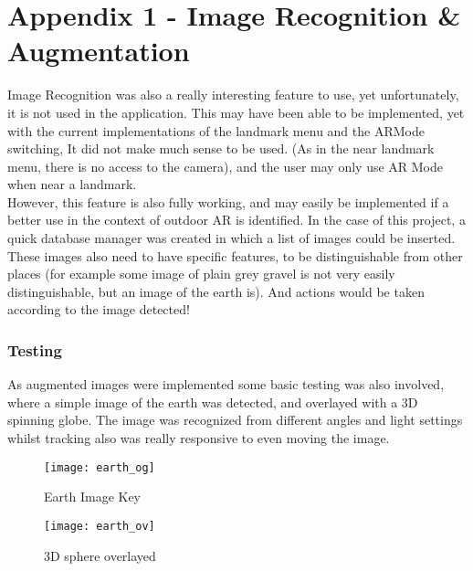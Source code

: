 \pagebreak
 \section*{Appendix 1 - Image Recognition \& Augmentation}
 Image Recognition was also a really interesting feature to use, yet unfortunately, it is not used in the application. This may have been able to be implemented, yet with the current implementations 
 of the landmark menu and the ARMode switching, It did not make much sense to be used. (As in the near landmark menu, there is no access to the camera), and the user may only use AR Mode when near a landmark.\\
 However, this feature is also fully working, and may easily be implemented if a better use in the context of outdoor AR is identified. 
 In the case of this project, a quick database manager was created in which a list of images could
  be inserted. These images also need to have specific features, to be distinguishable from other places (for example some image of plain grey gravel is not very easily distinguishable, 
  but an image of the earth is). And actions would be taken according to the image detected!
  \subsubsection*{Testing}
As augmented images were implemented some basic testing was also involved, where a simple image of the earth was detected, and overlayed with a 3D spinning globe. 
The image was recognized from different angles and light settings whilst tracking also was really responsive to even moving the image.
\begin{figure}[!htb]
        \texttt{[image: earth\_og]}
            \caption{Earth Image Key}
            \label{fig:earth_og}
    \endminipage\hfill
        \texttt{[image: earth\_ov]}
        \caption{3D sphere overlayed}
        \label{fig:earth_ov}
    \endminipage
    \end{figure}